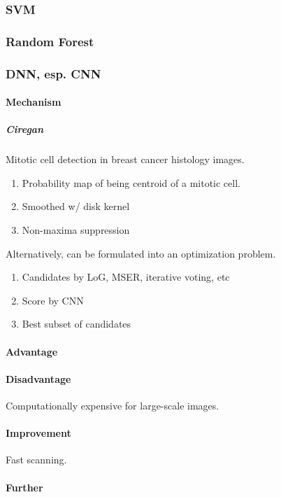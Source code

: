 \documentclass[10pt,a4paper]{article}
\begin{document}
\subsubsection{SVM}

\subsubsection{Random Forest}
\subsubsection{DNN, esp. CNN}
\paragraph{Mechanism}


\subparagraph{Ciregan} Mitotic cell detection in breast cancer histology images.
\begin{enumerate}
	\item Probability map of being centroid of a mitotic cell.
	\item Smoothed w/ disk kernel
	\item Non-maxima suppression
\end{enumerate}
Alternatively, can be formulated into an optimization problem.
\begin{enumerate}
	\item Candidates by LoG, MSER, iterative voting, etc
	\item Score by CNN
	\item Best subset of candidates
\end{enumerate}

\paragraph{Advantage}
\paragraph{Disadvantage}
Computationally expensive for large-scale images.
\paragraph{Improvement}
Fast scanning.
\paragraph{Further}
\end{document}
